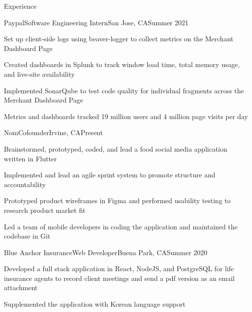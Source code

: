 \documentclass{article}
\newlength{\tabin}
\newlength{\secsep}
\newcommand{\lineunder}{\vspace*{-8pt} \\ \hspace*{-6pt} \hrulefill \\ \vspace*{-15pt}}
\newenvironment{tabbedsection}[1]{
  \begin{list}{}{
      \setlength{\itemsep}{0pt}
      \setlength{\labelsep}{0pt}
      \setlength{\labelwidth}{0pt}
      \setlength{\leftmargin}{\tabin}
      \setlength{\rightmargin}{\tabin}
      \setlength{\listparindent}{0pt}
      \setlength{\parsep}{0pt}
      \setlength{\parskip}{0pt}
      \setlength{\partopsep}{0pt}
      \setlength{\topsep}{#1}
    }
  \item[]
}{\end{list}}
\newenvironment{resume_section}[1]{
  \filbreak
  \vspace{2\secsep}
  \textsc{\large#1}
  \lineunder
  \begin{tabbedsection}{\secsep}
}{\end{tabbedsection}}
\newenvironment{subitems}{
  \renewcommand{\labelitemi}{-}
  \begin{itemize}
      \setlength{\labelsep}{1em}
}{\end{itemize}}
\newenvironment{resume_employer}[4]{
  \vspace{\secsep}
  \textbf{#1} \\ 
  \indent {\small #2} \hfill {\footnotesize#3 (#4)}
  \begin{tabbedsection}{0pt}
  \begin{subitems}
}{\end{subitems}\end{tabbedsection}}
\begin{document}
\begin{resume_section}{Experience}
  \begin{resume_employer}{Paypal}{Software Engineering Intern}{San Jose, CA}{Summer 2021}
    \item Set up client-side logs using beaver-logger to collect metrics on the Merchant Dashboard Page
    \item Created dashboards in Splunk to track window load time, total memory usage, and live-site availability
    \item Implemented SonarQube to test code quality for individual fragments across the Merchant Dashboard Page
    \item Metrics and dashboards tracked 19 million users and 4 million page visits per day
  \end{resume_employer}
   \begin{resume_employer}{Nom}{Cofounder}{Irvine, CA}{Present}
    \item Brainstormed, prototyped, coded, and lead a food social media application written in Flutter
    \item Implemented and lead an agile sprint system to promote structure and accountability
    \item Prototyped product wireframes in Figma and performed usability testing to research product market fit
    \item Led a team of mobile developers in coding the application and maintained the codebase in Git
  \end{resume_employer}
  \begin{resume_employer}{Blue Anchor Insurance}{Web Developer}{Buena Park, CA}{Summer 2020}
    \item Developed a full stack application in React, NodeJS, and PostgreSQL for life insurance agents to record client meetings and send a pdf version as an email attachment
    \item Supplemented the application with Korean language support
  \end{resume_employer}
\end{resume_section}
\end{document}

